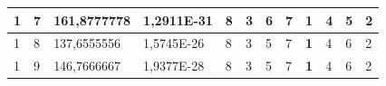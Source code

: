 \documentclass[conference]{IEEEtran}
\begin{document}
\begin{table}[]
\begin{tabular}{|llll|llllllll|}
\multicolumn{1}{|l|}{1}                                                                 & \multicolumn{1}{l|}{7}                                                                 & \multicolumn{1}{l|}{161,8777778}                                                           & 1,2911E-31                              & \multicolumn{1}{l|}{8}                                                           & \multicolumn{1}{l|}{3}                                                           & \multicolumn{1}{l|}{6}                                                           & \multicolumn{1}{l|}{7}                                                           & \multicolumn{1}{l|}{\textbf{1}}                                                  & \multicolumn{1}{l|}{4}                                                           & \multicolumn{1}{l|}{5}                                                           & 2                                   \\ \hline
\multicolumn{1}{|l|}{1}                                                              & \multicolumn{1}{l|}{8}                                                                 & \multicolumn{1}{l|}{137,6555556}                                                           & 1,5745E-26                              & \multicolumn{1}{l|}{8}                                                           & \multicolumn{1}{l|}{3}                                                           & \multicolumn{1}{l|}{5}                                                           & \multicolumn{1}{l|}{7}                                                           & \multicolumn{1}{l|}{\textbf{1}}                                                  & \multicolumn{1}{l|}{4}                                                           & \multicolumn{1}{l|}{6}                                                           & 2                                   \\ \hline
\multicolumn{1}{|l|}{1}                                                              & \multicolumn{1}{l|}{9}                                                                 & \multicolumn{1}{l|}{146,7666667}                                                           & 1,9377E-28                              & \multicolumn{1}{l|}{8}                                                           & \multicolumn{1}{l|}{3}                                                           & \multicolumn{1}{l|}{5}                                                           & \multicolumn{1}{l|}{7}                                                           & \multicolumn{1}{l|}{\textbf{1}}                                                  & \multicolumn{1}{l|}{4}                                                           & \multicolumn{1}{l|}{6}                                                           & 2                                   \\ \hline

\end{tabular}
\end{table}
\end{document}
